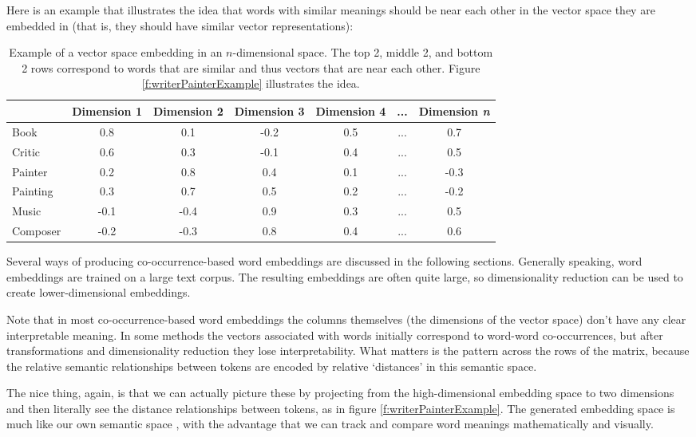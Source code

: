 Here is an example that illustrates the idea that words with similar meanings should be near each other in the vector space they are embedded in (that is, they should have similar vector representations):
\begin{table}[h]
    \centering
    \begin{tabular}{|l|c|c|c|c|c|c|}
    \hline
     & Dimension 1 & Dimension 2 & Dimension 3 & Dimension 4 & ... & Dimension \textit{n} \\
    \hline
    Book    & 0.8 & 0.1 & -0.2 & 0.5 & ... & 0.7  \\
    \hline
    Critic  & 0.6 & 0.3 & -0.1 & 0.4 & ... & 0.5  \\
    \hline
    Painter & 0.2 & 0.8 & 0.4 & 0.1 & ... & -0.3 \\
    \hline
    Painting& 0.3 & 0.7 & 0.5 & 0.2 & ... & -0.2  \\
    \hline
    Music   & -0.1 & -0.4 & 0.9 & 0.3 & ... & 0.5  \\
    \hline
    Composer& -0.2 & -0.3 & 0.8 & 0.4 & ... & 0.6 \\
    \hline
    \end{tabular}
    \caption{Example of a vector space embedding in an $n$-dimensional space. The top 2, middle 2, and bottom 2 rows correspond to words that are similar and thus vectors that are near each other.  Figure \ref{f:writerPainterExample} illustrates the idea.}
    \label{exampleEmbeddings}
\end{table}

Several ways of producing co-occurrence-based word embeddings are discussed in the following sections. Generally speaking, word embeddings are trained on a large text corpus. The resulting embeddings are often quite large, so dimensionality reduction can be used to create lower-dimensional embeddings.

Note that in most co-occurrence-based word embeddings the columns themselves (the dimensions of the vector space) don't have any clear interpretable meaning. In some methods the vectors associated with words initially correspond to word-word co-occurrences, but after transformations and dimensionality reduction they lose interpretability. What matters is the pattern across the rows of the matrix, because the relative semantic relationships between tokens are encoded by relative `distances' in this semantic space.

The nice thing, again, is that we can actually picture these by projecting from the high-dimensional embedding space to two dimensions and then literally see the distance relationships between tokens, as in figure \ref{f:writerPainterExample}. The generated embedding space is much like our own semantic space \cite{lewis2019distributional}, with the advantage that we can track and compare word meanings mathematically and visually.


